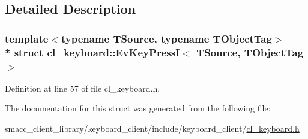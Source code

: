 \subsection{Detailed Description}
\subsubsection*{template$<$typename T\+Source, typename T\+Object\+Tag$>$\\*
struct cl\+\_\+keyboard\+::\+Ev\+Key\+Press\+I$<$ T\+Source, T\+Object\+Tag $>$}



Definition at line 57 of file cl\+\_\+keyboard.\+h.



The documentation for this struct was generated from the following file\+:\begin{DoxyCompactItemize}
\item 
smacc\+\_\+client\+\_\+library/keyboard\+\_\+client/include/keyboard\+\_\+client/\hyperlink{cl__keyboard_8h}{cl\+\_\+keyboard.\+h}\end{DoxyCompactItemize}

